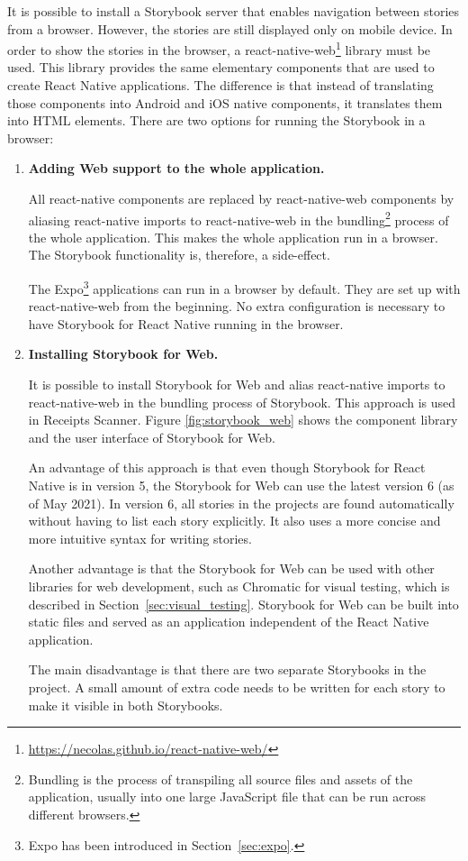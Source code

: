 \documentclass[
  digital, %
  table,   %
  oneside, %
  lof,     %
  lot,     %
]{fithesis3}
\begin{document}
It is possible to install a Storybook server that enables navigation between stories from a browser. However, the stories are still displayed only on mobile device. In order to show the stories in the browser, a react-native-web\footnote{\url{https://necolas.github.io/react-native-web/}} library must be used. This library provides the same elementary components that are used to create React Native applications. The difference is that instead of translating those components into Android and iOS native components, it translates them into HTML elements.
There are two options for running the Storybook in a browser:

\begin{enumerate}
    \item \textbf{Adding Web support to the whole application.}
    
    All react-native components are replaced by react-native-web components by aliasing react-native imports to react-native-web in the bundling\footnote{Bundling is the process of transpiling all source files and assets of the application, usually into one large JavaScript file that can be run across different browsers.} process of the whole application. This makes the whole application run in a browser. The Storybook functionality is, therefore, a side-effect.
    
    The Expo\footnote{Expo has been introduced in Section~\ref{sec:expo}.} applications can run in a browser by default. They are set up with react-native-web from the beginning. No extra configuration is necessary to have Storybook for React Native running in the browser.
    
    \item \textbf{Installing Storybook for Web.} 
    
    It is possible to install Storybook for Web and alias react-native imports to react-native-web in the bundling process of Storybook. This approach is used in Receipts Scanner. Figure \ref{fig:storybook_web} shows the component library and the user interface of Storybook for Web.
    
    An advantage of this approach is that even though Storybook for React Native is in version 5, the Storybook for Web can use the latest version 6 (as of May 2021). In version 6, all stories in the projects are found automatically without having to list each story explicitly. It also uses a more concise and more intuitive syntax for writing stories.
    
    Another advantage is that the Storybook for Web can be used with other libraries for web development, such as Chromatic for visual testing, which is described in Section~\ref{sec:visual_testing}. Storybook for Web can be built into static files and served as an application independent of the React Native application.
    
    The main disadvantage is that there are two separate Storybooks in the project. A small amount of extra code needs to be written for each story to make it visible in both Storybooks. 
    
\end{enumerate}
\end{document}

